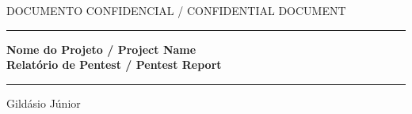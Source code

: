 \documentclass[12pt, oneside]{book}
\begin{document}

\begin{titlepage}

	\centering
    \color{white}

	\vspace{2cm}

	DOCUMENTO CONFIDENCIAL / CONFIDENTIAL DOCUMENT\par

    \vspace*{\fill}
	\vspace{4cm}
	\hrule
	\vspace{1cm}
	{\Huge \textbf{Nome do Projeto / Project Name}} \\
	\vspace{1cm}
	{\Large \textbf{Relatório de Pentest / Pentest Report}} \\
	\vspace{1cm}
	\hrule 
	\vspace{4cm}
	{\normalsize
		Gildásio Júnior
	}
	\vspace{2cm}


\end{titlepage}
\end{document}
